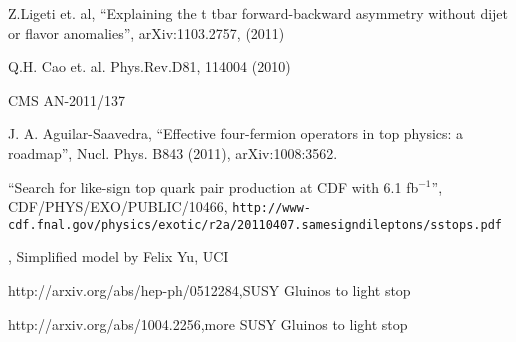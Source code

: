 \begin{thebibliography}{99}
 {Z.Ligeti et. al, ``Explaining the t tbar forward-backward asymmetry without dijet or flavor anomalies'', arXiv:1103.2757, (2011)}



 {Q.H. Cao et. al. Phys.Rev.D81, 114004 (2010)}

 {CMS AN-2011/137}

 {J. A. Aguilar-Saavedra, 
 ``Effective four-fermion operators in top physics: a roadmap'', 
 Nucl. Phys. B843 (2011), arXiv:1008:3562.}

 {``Search for like-sign top quark pair production at CDF with 6.1 fb$^{-1}$''}, CDF/PHYS/EXO/PUBLIC/10466, 
{\tt http://www-cdf.fnal.gov/physics/exotic/r2a/20110407.samesigndileptons/sstops.pdf}

,{ Simplified model by Felix Yu, UCI}

 { http://arxiv.org/abs/hep-ph/0512284},{SUSY Gluinos to light stop}

 { http://arxiv.org/abs/1004.2256},{more SUSY Gluinos to light stop}






\end{thebibliography}







